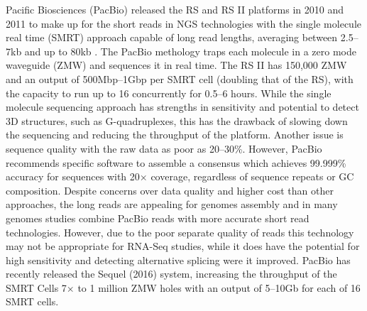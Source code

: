 Pacific Biosciences (PacBio) released the RS and RS II platforms in 2010 and 2011 to make up for the short reads in \gls{NGS} technologies with the single molecule real time (SMRT) approach capable of long read lengths, averaging between 2.5--7kb and up to 80kb \citep{pacbio}. The PacBio methology traps each molecule in a zero mode waveguide (ZMW) and sequences it in real time. The RS II has 150,000 ZMW and an output of 500Mbp--1Gbp per SMRT cell (doubling that of the RS), with the capacity to run up to 16 concurrently for 0.5--6 hours. While the single molecule sequencing approach has strengths in sensitivity and potential to detect 3D structures, such as G-quadruplexes, this has the drawback of slowing down the sequencing and reducing the throughput of the platform. Another issue is sequence quality with the raw data as poor as 20--30\%. However, PacBio recommends specific software to assemble a consensus which achieves 99.999\% accuracy for sequences with 20$\times$ coverage, regardless of sequence repeats or GC composition. Despite concerns over data quality and higher cost than other approaches, the long reads are appealing for \glspl{genome} assembly and in many \glspl{genome} studies combine PacBio reads with more accurate short read technologies. However, due to the poor separate quality of reads this technology may not be appropriate for \gls{RNA-Seq} studies, while it does have the potential for high sensitivity and detecting alternative splicing were it improved. PacBio has recently released the Sequel (2016) system, increasing the throughput of the SMRT Cells 7$\times$ to 1 million ZMW holes with an output of 5--10Gb for each of 16 SMRT cells. 

